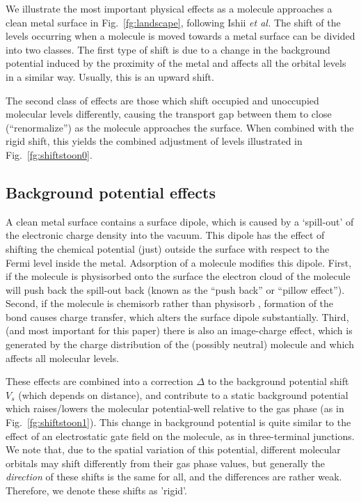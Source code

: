 \documentclass[aip,jcp,a4paper,reprint,floatfix,superscriptaddress]{revtex4-1}
\newcommand{\etal}{\emph{et al.}\xspace}
\begin{document}
We illustrate the most important physical effects as a molecule approaches a clean metal surface in Fig.~\ref{fg:landscape}, following Ishii \etal\cite{Ishii2000} 
The shift of the levels occurring when a molecule is moved towards a metal surface can be divided into two classes. The first type of shift is due to a change 
in the background potential induced by the proximity of the metal and affects all the orbital levels in a similar way. Usually, this is an upward shift. 

The second class of effects are those which shift occupied and unoccupied molecular levels differently, causing the transport gap between them to close (``renormalize'') as the molecule approaches the surface. When combined with the rigid shift, this yields the combined adjustment of levels illustrated in Fig.~\ref{fg:shiftstoon0}. %

\subsection{Background potential effects}

A clean metal surface contains a surface dipole, which is caused by a `spill-out' of the electronic charge density into the vacuum. This dipole has the effect of shifting the chemical potential (just)
outside the surface with respect to the Fermi level inside the metal. Adsorption of a molecule modifies this
dipole.\cite{Seki1997,Ishii1999,Ishii2000,Vazquez2004a,Vazquez2004b} First, if the molecule is physisorbed onto the surface the electron cloud of the molecule will push back the spill-out back (known as the ``push back'' or ``pillow effect'').\cite{Vazquez2007,Flores2009} 
Second, if the molecule is chemisorb rather than physisorb%
, formation of the bond causes charge transfer, which alters the surface dipole substantially. Third, 
(and most important for %
this paper) there is also an image-charge effect, which is generated by the charge distribution of the (possibly neutral) molecule and which  affects all molecular levels.

These effects are combined into a correction $\Delta$ to the background potential shift $V_s$ (which %
depends on distance), and contribute to a static background potential which raises/lowers the molecular potential-well relative to the gas phase (as in Fig.~\ref{fg:shiftstoon1}). 
This change in background potential is quite similar to the effect of an electrostatic gate field on the molecule, as in three-terminal junctions. 
We note that, due to the spatial variation of this potential, different molecular orbitals may shift differently from their gas phase values, but generally the \emph{direction} of these shifts is the same for all, and the differences are rather weak. Therefore, we denote these shifts as 'rigid'.  
 
\end{document}
